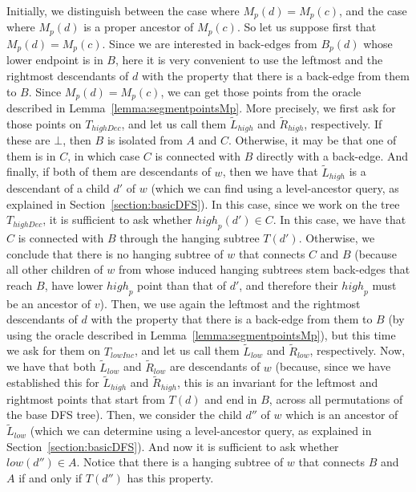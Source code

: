 \documentclass[11pt,a4paper]{article}
\begin{document}
Initially, we distinguish between the case where $M_p(d)=M_p(c)$, and the case where $M_p(d)$ is a proper ancestor of $M_p(c)$. So let us suppose first that $M_p(d)=M_p(c)$. Since we are interested in back-edges from $B_p(d)$ whose lower endpoint is in $B$, here it is very convenient to use the leftmost and the rightmost descendants of $d$ with the property that there is a back-edge from them to $B$. Since $M_p(d)=M_p(c)$, we can get those points from the oracle described in Lemma~\ref{lemma:segmentpointsMp}. More precisely, we first ask for those points on $T_\mathit{highDec}$, and let us call them $\widetilde{L}_\mathit{high}$ and $\widetilde{R}_\mathit{high}$, respectively. If these are $\bot$, then $B$ is isolated from $A$ and $C$. Otherwise, it may be that one of them is in $C$, in which case $C$ is connected with $B$ directly with a back-edge. And finally, if both of them are descendants of $w$, then we have that $\widetilde{L}_\mathit{high}$ is a descendant of a child $d'$ of $w$ (which we can find using a level-ancestor query, as explained in Section~\ref{section:basicDFS}). In this case, since we work on the tree $T_\mathit{highDec}$, it is sufficient to ask whether $\mathit{high}_p(d')\in C$. In this case, we have that $C$ is connected with $B$ through the hanging subtree $T(d')$. Otherwise, we conclude that there is no hanging subtree of $w$ that connects $C$ and $B$ (because all other children of $w$ from whose induced hanging subtrees stem back-edges that reach $B$, have lower $\mathit{high}_p$ point than that of $d'$, and therefore their $\mathit{high}_p$ must be an ancestor of $v$). Then, we use again the leftmost and the rightmost descendants of $d$ with the property that there is a back-edge from them to $B$ (by using the oracle described in Lemma~\ref{lemma:segmentpointsMp}), but this time we ask for them on $T_\mathit{lowInc}$, and let us call them $\widetilde{L}_\mathit{low}$ and $\widetilde{R}_\mathit{low}$, respectively. Now, we have that both $\widetilde{L}_\mathit{low}$ and $\widetilde{R}_\mathit{low}$ are descendants of $w$ (because, since we have established this for $\widetilde{L}_\mathit{high}$ and $\widetilde{R}_\mathit{high}$, this is an invariant for the leftmost and rightmost points that start from $T(d)$ and end in $B$, across all permutations of the base DFS tree). Then, we consider the child $d''$ of $w$ which is an ancestor of $\widetilde{L}_\mathit{low}$ (which we can determine using a level-ancestor query, as explained in Section~\ref{section:basicDFS}). And now it is sufficient to ask whether $\mathit{low}(d'')\in A$. Notice that there is a hanging subtree of $w$ that connects $B$ and $A$ if and only if $T(d'')$ has this property.
\end{document}

